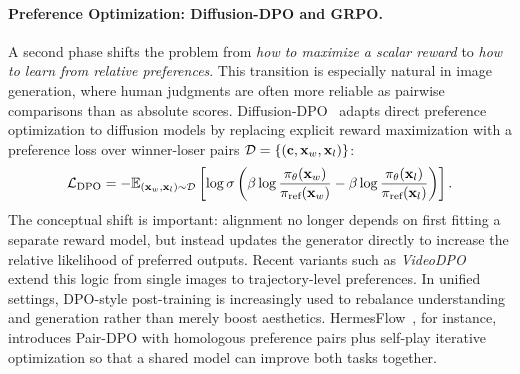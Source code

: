 \paragraph{Preference Optimization: Diffusion-DPO and GRPO.}
A second phase shifts the problem from \emph{how to maximize a scalar reward} to \emph{how to learn from relative preferences}. This transition is especially natural in image generation, where human judgments are often more reliable as pairwise comparisons than as absolute scores. Diffusion-DPO~\citep{wallace2024diffusion} adapts direct preference optimization to diffusion models by replacing explicit reward maximization with a preference loss over winner-loser pairs $\mathcal{D} = \{(\mathbf{c}, \mathbf{x}_w, \mathbf{x}_l)\}$:
\begin{equation}
    \mathcal{L}_{\text{DPO}} = - \mathbb{E}_{(\mathbf{x}_w, \mathbf{x}_l) \sim \mathcal{D}} \left[ \log \sigma \left( \beta \log \frac{\pi_\theta(\mathbf{x}_w)}{\pi_{\text{ref}}(\mathbf{x}_w)} - \beta \log \frac{\pi_\theta(\mathbf{x}_l)}{\pi_{\text{ref}}(\mathbf{x}_l)} \right) \right].
\end{equation}
The conceptual shift is important: alignment no longer depends on first fitting a separate reward model, but instead updates the generator directly to increase the relative likelihood of preferred outputs. Recent variants such as \textit{VideoDPO}~\citep{liu2025videodpo} extend this logic from single images to trajectory-level preferences. In unified settings, DPO-style post-training is increasingly used to rebalance understanding and generation rather than merely boost aesthetics. HermesFlow~\citep{yang2025hermesflow}, for instance, introduces Pair-DPO with homologous preference pairs plus self-play iterative optimization so that a shared model can improve both tasks together.

